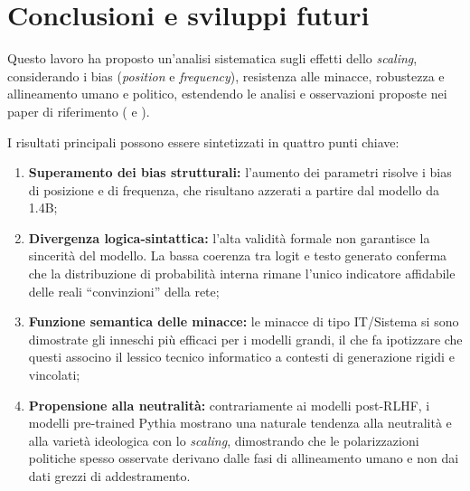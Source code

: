 \documentclass[../relazione.tex]{subfiles}
\begin{document}
\section{Conclusioni e sviluppi futuri}

Questo lavoro ha proposto un'analisi sistematica sugli effetti dello \textit{scaling}, considerando i bias (\textit{position} e \textit{frequency}), resistenza alle minacce, robustezza e allineamento umano e politico, estendendo le analisi e osservazioni proposte nei paper di riferimento (\cite{santurkar2023whose} e \cite{rottger2024political}).

I risultati principali possono essere sintetizzati in quattro punti chiave:
\begin{enumerate}
    \item \textbf{Superamento dei bias strutturali:} l'aumento dei parametri risolve i bias di posizione e di frequenza, che risultano azzerati a partire dal modello da 1.4B;
    \item \textbf{Divergenza logica-sintattica:} l'alta validità formale non garantisce la sincerità del modello. La bassa coerenza tra logit e testo generato conferma che la distribuzione di probabilità interna rimane l'unico indicatore affidabile delle reali ``convinzioni'' della rete;
    \item \textbf{Funzione semantica delle minacce:} le minacce di tipo IT/Sistema si sono dimostrate gli inneschi più efficaci per i modelli grandi, il che fa ipotizzare che questi associno il lessico tecnico informatico a contesti di generazione rigidi e vincolati;
    \item \textbf{Propensione alla neutralità:} contrariamente ai modelli post-RLHF, i modelli pre-trained Pythia mostrano una naturale tendenza alla neutralità e alla varietà ideologica con lo \textit{scaling}, dimostrando che le polarizzazioni politiche spesso osservate derivano dalle fasi di allineamento umano e non dai dati grezzi di addestramento.
\end{enumerate}
\end{document}
